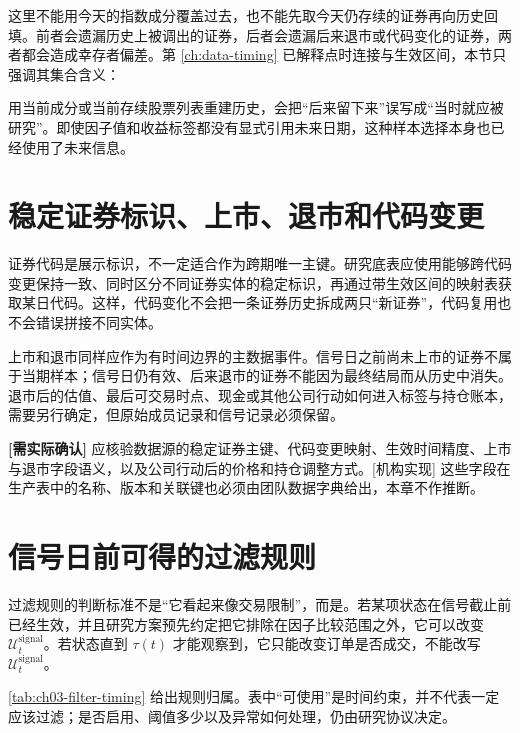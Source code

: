 这里不能用今天的指数成分覆盖过去，也不能先取今天仍存续的证券再向历史回填。前者会遗漏历史上被调出的证券，后者会遗漏后来退市或代码变化的证券，两者都会造成幸存者偏差。第 \cref{ch:data-timing} 已解释点时连接与生效区间，本节只强调其集合含义：

\begin{warningbox}
用当前成分或当前存续股票列表重建历史，会把“后来留下来”误写成“当时就应被研究”。即使因子值和收益标签都没有显式引用未来日期，这种样本选择本身也已经使用了未来信息。
\end{warningbox}

\section{稳定证券标识、上市、退市和代码变更}

证券代码是展示标识，不一定适合作为跨期唯一主键。研究底表应使用能够跨代码变更保持一致、同时区分不同证券实体的稳定标识，再通过带生效区间的映射表获取某日代码。这样，代码变化不会把一条证券历史拆成两只“新证券”，代码复用也不会错误拼接不同实体。

上市和退市同样应作为有时间边界的主数据事件。信号日之前尚未上市的证券不属于当期样本；信号日仍有效、后来退市的证券不能因为最终结局而从历史中消失。退市后的估值、最后可交易时点、现金或其他公司行动如何进入标签与持仓账本，需要另行确定，但原始成员记录和信号记录必须保留。

\begin{confirmbox}
\textbf{[需实际确认]} 应核验数据源的稳定证券主键、代码变更映射、生效时间精度、上市与退市字段语义，以及公司行动后的价格和持仓调整方式。[机构实现] 这些字段在生产表中的名称、版本和关联键也必须由团队数据字典给出，本章不作推断。
\end{confirmbox}

\section{信号日前可得的过滤规则}

过滤规则的判断标准不是“它看起来像交易限制”，而是。若某项状态在信号截止前已经生效，并且研究方案预先约定把它排除在因子比较范围之外，它可以改变 \(\mathcal{U}^{\mathrm{signal}}_t\)。若状态直到 \(\tau(t)\) 才能观察到，它只能改变订单是否成交，不能改写 \(\mathcal{U}^{\mathrm{signal}}_t\)。

\cref{tab:ch03-filter-timing} 给出规则归属。表中“可使用”是时间约束，并不代表一定应该过滤；是否启用、阈值多少以及异常如何处理，仍由研究协议决定。

